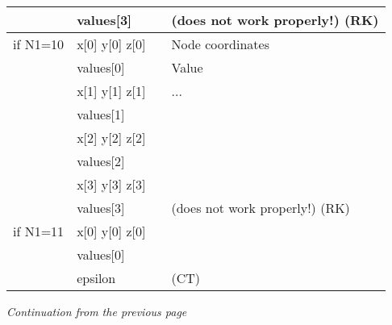 \begin{tabular}{|p{1.5cm}|p{2.75cm}|c|p{8.5cm}|}
            & {\footnotesize values[3]}      &      & \hfill (does not work properly!) (RK) \\
%
  \hline
%
%
  if N1=10  & {\footnotesize x[0] y[0] z[0]} &      & Node coordinates                      \\
            & {\footnotesize values[0]}      &      & Value                                 \\
            & {\footnotesize x[1] y[1] z[1]} &      & ...                                   \\
            & {\footnotesize values[1]}      &      &                                       \\
            & {\footnotesize x[2] y[2] z[2]} &      &                                       \\
            & {\footnotesize values[2]}      &      &                                       \\
            & {\footnotesize x[3] y[3] z[3]} &      &                                       \\
            & {\footnotesize values[3]}      &      & \hfill (does not work properly!) (RK) \\
%
  \hline
%
  if N1=11  & {\footnotesize x[0] y[0] z[0]} &      &                        \\
            & {\footnotesize values[0]}      &      &                        \\
            & {\footnotesize epsilon}        &      &         \hfill (CT)    \\
%
  \hline
%
\end{tabular}

\newpage
{\it Continuation from the previous page}

